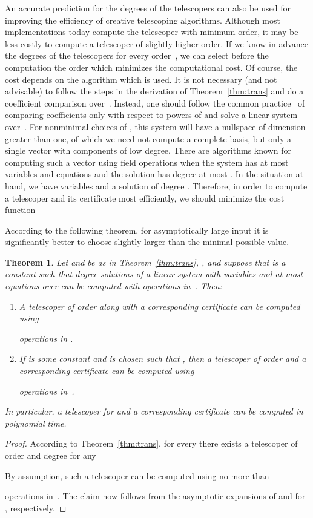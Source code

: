\documentclass{sig-alternate}
\newtheorem{theorem}{Theorem}
\begin{document}
An accurate prediction for the degrees of the telescopers can also be used for improving the efficiency
of creative telescoping algorithms. Although most implementations today compute the telescoper
with minimum order, it may be less costly to compute a telescoper of slightly higher order. If
we know in advance the degrees  of the telescopers for every order~, we can select before
the computation the order  which minimizes the computational cost. Of course, the cost depends
on the algorithm which is used. It is not necessary (and not advisable) to follow the steps in the
derivation of Theorem~\ref{thm:trans} and do a coefficient comparison over~. Instead, one should
follow the common practice~\cite{koutschan10b} of comparing coefficients only with respect to powers of 
and solve a linear system over~. For nonminimal choices of , this system will have a
nullspace of dimension greater than one, of which we need not compute a complete basis,
but only a single vector with components of low degree. There are algorithms known for computing
such a vector using  field operations when the system has at most  variables and equations and the
solution has degree at most  \cite{beckermann94,storjohann05,bostan07}. In the situation at hand, we have
 variables and a solution of degree .
Therefore, in order to compute a telescoper
and its certificate most efficiently, we should minimize the cost function

According to the following theorem, for asymptotically large input it is significantly better to
choose  slightly larger than the minimal possible value.

\begin{theorem}\label{thm:trans:compl}
  Let  and  be as in Theorem~\ref{thm:trans}, ,
  and suppose that  is a constant such that degree  solutions of a linear system
  with  variables and at most  equations over  can be computed with  operations
  in~. Then:
  \begin{enumerate}
  \item A telescoper of order  along with a corresponding certificate can be computed using
  
  operations in .
  \item\label{it:2} If  is some constant and  is chosen such that
  ,
  then a telescoper of order  and a corresponding certificate can be computed using
  
  operations in~.
  \end{enumerate}
  In particular, a telescoper for  and a corresponding certificate can be computed
  in polynomial time.
\end{theorem}
\begin{proof}
  According to Theorem~\ref{thm:trans}, for every  there exists a telescoper of
  order  and degree  for any
  
  By assumption, such a telescoper can be computed using no more than
  
  operations in~. The claim now follows from the asymptotic expansions of
   and  for , respectively.
\end{proof}
\end{document}
